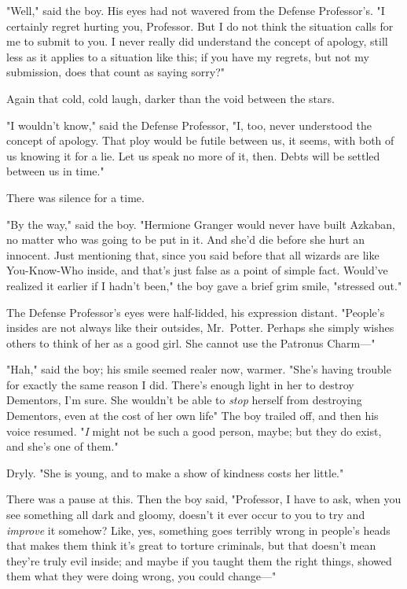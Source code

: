 "Well," said the boy. His eyes had not wavered from the Defense Professor's. "I
certainly regret hurting you, Professor. But I do not think the situation calls
for me to submit to you. I never really did understand the concept of apology,
still less as it applies to a situation like this; if you have my regrets, but
not my submission, does that count as saying sorry?"

Again that cold, cold laugh, darker than the void between the stars.

"I wouldn't know," said the Defense Professor, "I, too, never understood the
concept of apology. That ploy would be futile between us, it seems, with both
of us knowing it for a lie. Let us speak no more of it, then. Debts will be
settled between us in time."

There was silence for a time.

"By the way," said the boy. "Hermione Granger would never have built Azkaban,
no matter who was going to be put in it. And she'd die before she hurt an
innocent. Just mentioning that, since you said before that all wizards are like
You-Know-Who inside, and that's just false as a point of simple fact. Would've
realized it earlier if I hadn't been," the boy gave a brief grim smile,
"stressed out."

The Defense Professor's eyes were half-lidded, his expression distant.
"People's insides are not always like their outsides, Mr.~Potter. Perhaps she
simply wishes others to think of her as a good girl. She cannot use the
Patronus Charm\mbox{---}"

"Hah," said the boy; his smile seemed realer now, warmer. "She's having trouble
for exactly the same reason I did. There's enough light in her to destroy
Dementors, I'm sure. She wouldn't be able to \emph{stop} herself from
destroying Dementors, even at the cost of her own life{\el}" The boy trailed
off, and then his voice resumed. "\emph{I} might not be such a good person,
maybe; but they do exist, and she's one of them."

Dryly. "She is young, and to make a show of kindness costs her little."

There was a pause at this. Then the boy said, "Professor, I have to ask, when
you see something all dark and gloomy, doesn't it ever occur to you to try and
\emph{improve} it somehow? Like, yes, something goes terribly wrong in people's
heads that makes them think it's great to torture criminals, but that doesn't
mean they're truly evil inside; and maybe if you taught them the right things,
showed them what they were doing wrong, you could change\mbox{---}"

